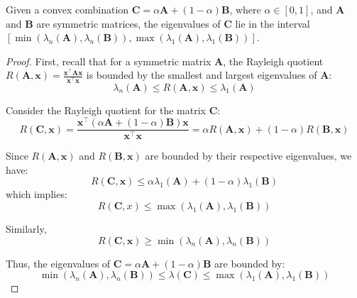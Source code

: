 \begin{claim}\label{claim:convex-combo-eigenvalues}
Given a convex combination \(\mathbf{C} = \alpha \mathbf{A} + (1-\alpha) \mathbf{B}\), where \(\alpha \in [0,1]\), and \(\mathbf{A}\) and \(\mathbf{B}\) are symmetric matrices, the eigenvalues of \(\mathbf{C}\) lie in the interval \(\left[\min \left(\lambda_n(\mathbf{A}), \lambda_n(\mathbf{B})\right), \max \left(\lambda_1(\mathbf{A}), \lambda_1(\mathbf{B})\right)\right]\).
\end{claim}
\begin{proof}


First, recall that for a symmetric matrix \(\mathbf{A}\), the Rayleigh quotient \(R(\mathbf{A}, \mathbf{x}) = \frac{\mathbf{x}^{\top} \mathbf{A} \mathbf{x}}{\mathbf{x}^{\top} \mathbf{x}}\) is bounded by the smallest and largest eigenvalues of \(\mathbf{A}\):
\[
\lambda_n(\mathbf{A}) \leq R(\mathbf{A}, \mathbf{x}) \leq \lambda_1(\mathbf{A})
\]

Consider the Rayleigh quotient for the matrix \(\mathbf{C}\):
\[
R(\mathbf{C}, \mathbf{x}) = \frac{\mathbf{x}^{\top} (\alpha \mathbf{A} + (1-\alpha) \mathbf{B}) \mathbf{x}}{\mathbf{x}^{\top} \mathbf{x}} = \alpha R(\mathbf{A}, \mathbf{x}) + (1-\alpha) R(\mathbf{B}, \mathbf{x})
\]

Since \(R(\mathbf{A}, \mathbf{x})\) and \(R(\mathbf{B}, \mathbf{x})\) are bounded by their respective eigenvalues, we have:
\[
R(\mathbf{C}, \mathbf{x}) \leq \alpha \lambda_1(\mathbf{A}) + (1-\alpha) \lambda_1(\mathbf{B})
\]
which implies:
\[ 
R(\mathbf{C}, x)  \leq   \max(\lambda_1(\textbf{A}), \lambda_1(\textbf{B}))
\]

Similarly,
\[ 
R(\textbf{C}, \textbf{x})  \geq  \min(\lambda_n(\textbf{A}), \lambda_n(\textbf{B}))
\]

Thus, the eigenvalues of \(\textbf{C} = \alpha \textbf{A} + (1-\alpha)\textbf{B}\) are bounded by:
\[ 
\min(\lambda_n(\textbf{A}), \lambda_n(\textbf{B})) \leq  \lambda(\textbf{C}) \leq \max(\lambda_1(\textbf{A}), \lambda_1(\textbf{B}))
\]
\end{proof}
